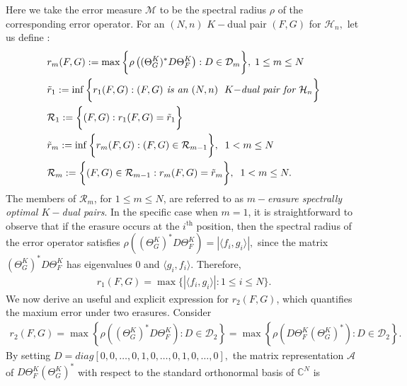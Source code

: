 \documentclass[final,1p,times]{elsarticle}
\begin{document}
Here we take the error measure \( \mathcal{M} \) to be the spectral radius \( \rho \) of the corresponding error operator. For an $(N,n)$ $K-$dual pair $(F,G)$ for $\mathcal{H}_n,$ let us define
:
\begin{align*}
	&r_{m} (F,G) :=\max \bigg\{\rho\left( (\Theta_{G}^K)^* D\Theta_{F}^K\right) : D \in \mathcal{D}_{m} \bigg\},\; 1 \leq m \leq N\\
	& \tilde{r}_{1}  := \inf \bigg\{ r_{1} (F,G) : \textit{$(F,G)$ \text{is an $(N,n)\;$  $K-$dual pair for} $\mathcal{H}_n$} \bigg\}\\
	&\mathcal{R}_{1} := \bigg\{ (F,G) : r_{1} (F,G) = \tilde{r}_{1} \bigg\}\\
	&\tilde{r}_{m} := \inf \bigg\{ r_{m} (F,G) : (F,G) \in \mathcal{R}_{m-1} \bigg\},\;\; 1< m \leq N\\
	& \mathcal{R}_{m} := \bigg\{(F,G)\in \mathcal{R}_{m-1} : r_{m} (F,G) =  \tilde{r}_{m} \bigg\}, \;\; 1 < m \leq N.
\end{align*}
The members of \( \mathcal{R}_{m} \), for \( 1 \leq m \leq N \), are referred to as \textit{$m-$erasure spectrally optimal \( K-\)dual pairs}. In the specific case when \( m = 1 \), it is straightforward to observe that if the erasure occurs at the \( i^{\text{th}} \) position, then the spectral radius of the error operator satisfies $\rho\left((\Theta_{G}^K)^* D \Theta_{F}^K\right) = |\langle f_i , g_i \rangle|,$ since the matrix \( (\Theta_{G}^K)^* D \Theta_{F}^K \) has eigenvalues \( 0 \) and \( \langle g_i, f_i \rangle \).
Therefore,
\begin{align}\label{equation3point1}
	r_{1} (F,G) = \max \bigg\{ |\langle f_i , g_i \rangle | : 1\leq i \leq N \bigg\} .
\end{align}
We now derive an useful and explicit expression for \( r_2(F, G) \), which quantifies the maxium error under two erasures. Consider
\begin{eqnarray*}
	r_{2} (F,G) = \max \left\{ \rho\left((\Theta_{G}^K)^* D\Theta_{F}^K \right) : D \in \mathcal{D}_{2} \right\} = \max \left\{ \rho \left(D\Theta_{F}^K (\Theta_{G}^K)^* \right) : D \in \mathcal{D}_{2} \right\}.
\end{eqnarray*}
By setting  $D = diag [0,0,\ldots,0,1,0,\ldots,0,1,0,\ldots,0],$ the matrix representation $\mathcal{A}$ of $D\Theta_{F}^K (\Theta_{G}^K)^*$ with respect to the standard orthonormal basis of $\mathbb{C}^N$ is
\end{document}
